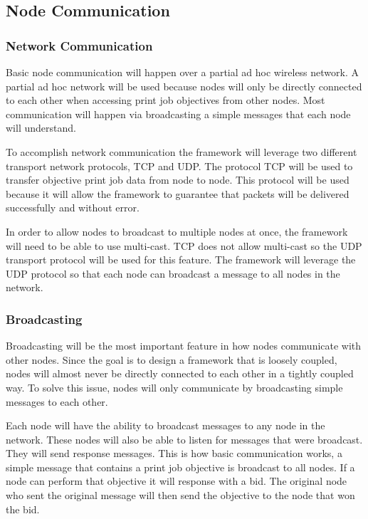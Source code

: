 \documentclass[draftclsnofoot, onecolumn, compsoc, 10pt]{IEEEtran}
\begin{document}
\subsection{Node Communication}
\subsubsection{Network Communication}
Basic node communication will happen over a partial ad hoc wireless network. A partial ad hoc network will be used because nodes will only be directly connected to each other when accessing print job objectives from other nodes. Most communication will happen via broadcasting a simple messages that each node will understand.

To accomplish network communication the framework will leverage two different transport network protocols, TCP and UDP. The protocol TCP will be used to transfer objective print job data from node to node. This protocol will be used because it will allow the framework to guarantee that packets will be delivered successfully and without error. 

In order to allow nodes to broadcast to multiple nodes at once, the framework will need to be able to use multi-cast. TCP does not allow multi-cast so the UDP transport protocol will be used for this feature. The framework will leverage the UDP protocol so that each node can broadcast a message to all nodes in the network. 

\subsubsection{Broadcasting}
Broadcasting will be the most important feature in how nodes communicate with other nodes. Since the goal is to design a framework that is loosely coupled, nodes will almost never be directly connected to each other in a tightly coupled way. To solve this issue, nodes will only communicate by broadcasting simple messages to each other.

Each node will have the ability to broadcast messages to any node in the network. These nodes will also be able to listen for messages that were broadcast. They will send response messages. This is how basic communication works, a simple message that contains a print job objective is broadcast to all nodes. If a node can perform that objective it will response with a bid. The original node who sent the original message will then send the objective to the node that won the bid. 
\end{document}
